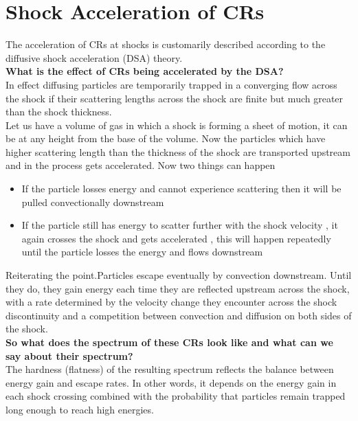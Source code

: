 \documentclass[11pt]{report}
\newcommand{\tbf}[1]{\textbf{#1}}
\begin{document}
\section{Shock Acceleration of CRs}
The acceleration of CRs at shocks is customarily described according to the diffusive shock acceleration (DSA) theory.\\

\tbf{What is the effect of CRs being accelerated by the DSA?}\\
In effect diffusing particles are temporarily trapped in a converging flow across the shock if their scattering lengths across the shock are finite but much greater than the shock thickness.\\

Let us have a volume of gas in which a shock is forming a sheet of motion, it can be at any height from the base of the volume. Now the particles which have higher scattering length than the thickness of the shock are transported upstream and in the process gets accelerated. Now two things can happen
\begin{itemize}

\item If the particle losses energy and cannot experience scattering then it will be pulled convectionally downstream

\item If the particle still has energy to scatter further with the shock velocity , it again crosses the shock and gets accelerated , this will happen repeatedly until the particle losses the energy and flows downstream
\end{itemize}

Reiterating the point.Particles escape eventually by convection downstream. Until they do, they gain energy each time they are reflected upstream across the shock, with a rate determined by the velocity change they encounter across the shock discontinuity and a competition between convection and diffusion on both sides of the shock. \\

\tbf{So what does the spectrum of these CRs look like and what can we say about their spectrum?}\\
The hardness (flatness) of the resulting spectrum reflects the balance between energy gain and escape rates. In other words, it depends on the energy gain in each shock crossing combined with the probability that particles remain trapped long enough to reach high energies.\\
\end{document}
